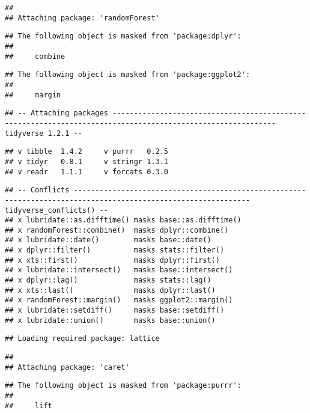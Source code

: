 \documentclass[]{article}
\begin{document}
\begin{verbatim}
## 
## Attaching package: 'randomForest'
\end{verbatim}

\begin{verbatim}
## The following object is masked from 'package:dplyr':
## 
##     combine
\end{verbatim}

\begin{verbatim}
## The following object is masked from 'package:ggplot2':
## 
##     margin
\end{verbatim}

\begin{verbatim}
## -- Attaching packages ------------------------------------------------------------------------------------------------------------ tidyverse 1.2.1 --
\end{verbatim}

\begin{verbatim}
## v tibble  1.4.2     v purrr   0.2.5
## v tidyr   0.8.1     v stringr 1.3.1
## v readr   1.1.1     v forcats 0.3.0
\end{verbatim}

\begin{verbatim}
## -- Conflicts --------------------------------------------------------------------------------------------------------------- tidyverse_conflicts() --
## x lubridate::as.difftime() masks base::as.difftime()
## x randomForest::combine()  masks dplyr::combine()
## x lubridate::date()        masks base::date()
## x dplyr::filter()          masks stats::filter()
## x xts::first()             masks dplyr::first()
## x lubridate::intersect()   masks base::intersect()
## x dplyr::lag()             masks stats::lag()
## x xts::last()              masks dplyr::last()
## x randomForest::margin()   masks ggplot2::margin()
## x lubridate::setdiff()     masks base::setdiff()
## x lubridate::union()       masks base::union()
\end{verbatim}

\begin{verbatim}
## Loading required package: lattice
\end{verbatim}

\begin{verbatim}
## 
## Attaching package: 'caret'
\end{verbatim}

\begin{verbatim}
## The following object is masked from 'package:purrr':
## 
##     lift
\end{verbatim}
\end{document}
